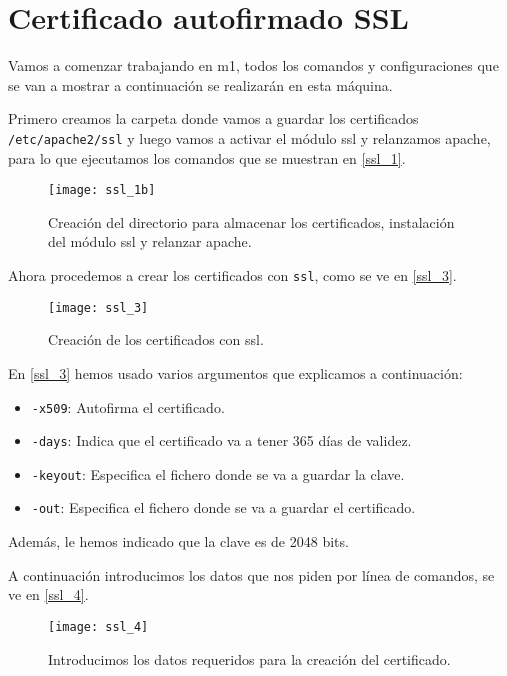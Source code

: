 
\chapter{Certificado autofirmado SSL}

Vamos a comenzar trabajando en m1, todos los comandos y configuraciones que se van a mostrar a continuación se realizarán en esta máquina.

Primero creamos la carpeta donde vamos a guardar los certificados \verb|/etc/apache2/ssl| y luego vamos a activar el módulo ssl y relanzamos apache, para lo que ejecutamos los comandos que se muestran en \eqref{ssl_1}.

\begin{figure}[h!]
\begin{center}
\caption{Creación del directorio para almacenar los certificados, instalación del módulo ssl y relanzar apache.}
\label{ssl_1}
\texttt{[image: ssl\_1b]}
\end{center}
\end{figure}

Ahora procedemos a crear los certificados con \verb|ssl|, como se ve en \eqref{ssl_3}.

\begin{figure}[h!]
\begin{center}
\caption{Creación de los certificados con ssl.}
\label{ssl_3}
\texttt{[image: ssl\_3]}
\end{center}
\end{figure}

En \eqref{ssl_3} hemos usado varios argumentos que explicamos a continuación:

\begin{itemize}
\item \verb|-x509|: Autofirma el certificado.
\item \verb|-days|: Indica que el certificado va a tener 365 días de validez.
\item \verb|-keyout|: Especifica el fichero donde se va a guardar la clave.
\item \verb|-out|: Especifica el fichero donde se va a guardar el certificado.
\end{itemize}

Además, le hemos indicado que la clave es de 2048 bits.

A continuación introducimos los datos que nos piden por línea de comandos, se ve en \eqref{ssl_4}.

\begin{figure}[h!]
\begin{center}
\caption{Introducimos los datos requeridos para la creación del certificado.}
\label{ssl_4}
\texttt{[image: ssl\_4]}
\end{center}
\end{figure}

